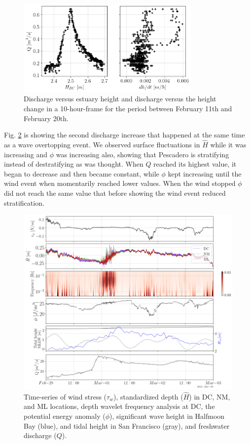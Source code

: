 \documentclass[tesis.tex]{subfiles}
\begin{document}
\begin{figure}[h!]
    \centering
    \includegraphics[width=0.8\textwidth]{Imagenes/qh.png}
    \caption{Discharge versus estuary height and discharge versus the height change in a 10-hour-frame for the period between February 11th and February 20th.}
    \label{fig:qh}
\end{figure}

Fig. \ref{fig:mix_q} is showing the second discharge increase that happened at the same time as a wave overtopping event. We observed surface fluctuations in $\hat{H}$ while it was increasing and $\phi$ was increasing also, showing that Pescadero is stratifying instead of destratifying as was thought. When $Q$ reached its highest value, it began to decrease and then became constant, while $\phi$ kept increasing until the wind event when momentarily reached lower values. When the wind stopped $\phi$ did not reach the same value that before showing the wind event reduced stratification.\\

\begin{figure}[h!]
    \centering
    \includegraphics[width=\textwidth]{Imagenes/mix_q2.png}
    \caption{Time-series of wind stress ($\tau_w$), standardized depth ($\hat{H}$) in DC, NM, and ML locations, depth wavelet frequency analysis at DC, the potential energy anomaly ($\phi$), significant wave height in Halfmoon Bay (blue), and tidal height in San Francisco (gray), and freshwater discharge ($Q$). }
    \label{fig:mix_q}
\end{figure}
\end{document}
